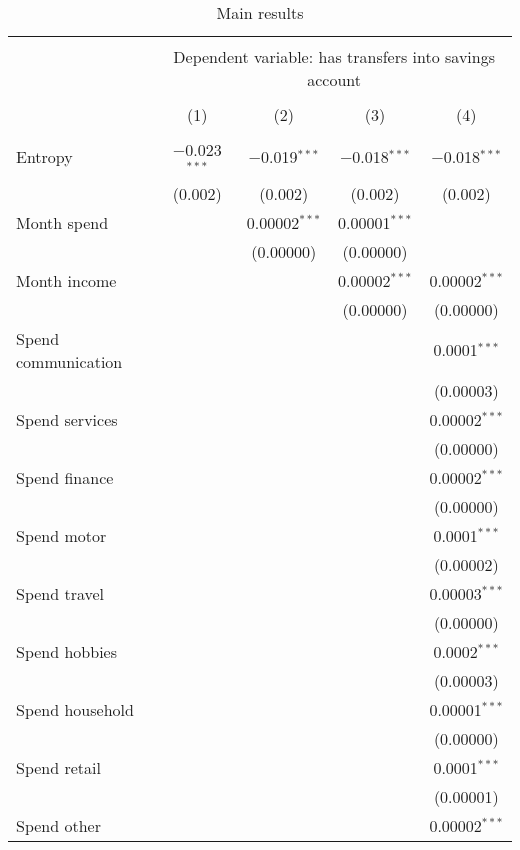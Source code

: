 
\begin{table}[!htbp] \centering 
  \caption{Main results} 
  \label{} 
\begin{tabular}{@{\extracolsep{5pt}}lcccc} 
\\[-1.8ex]\hline 
\hline \\[-1.8ex] 
 & \multicolumn{4}{c}{Dependent variable: has transfers into savings account} \\ 
\cline{2-5} 
\\[-1.8ex] & (1) & (2) & (3) & (4)\\ 
\hline \\[-1.8ex] 
 Entropy & $-$0.023$^{***}$ & $-$0.019$^{***}$ & $-$0.018$^{***}$ & $-$0.018$^{***}$ \\ 
  & (0.002) & (0.002) & (0.002) & (0.002) \\ 
  Month spend &  & 0.00002$^{***}$ & 0.00001$^{***}$ &  \\ 
  &  & (0.00000) & (0.00000) &  \\ 
  Month income &  &  & 0.00002$^{***}$ & 0.00002$^{***}$ \\ 
  &  &  & (0.00000) & (0.00000) \\ 
  Spend communication &  &  &  & 0.0001$^{***}$ \\ 
  &  &  &  & (0.00003) \\ 
  Spend services &  &  &  & 0.00002$^{***}$ \\ 
  &  &  &  & (0.00000) \\ 
  Spend finance &  &  &  & 0.00002$^{***}$ \\ 
  &  &  &  & (0.00000) \\ 
  Spend motor &  &  &  & 0.0001$^{***}$ \\ 
  &  &  &  & (0.00002) \\ 
  Spend travel &  &  &  & 0.00003$^{***}$ \\ 
  &  &  &  & (0.00000) \\ 
  Spend hobbies &  &  &  & 0.0002$^{***}$ \\ 
  &  &  &  & (0.00003) \\ 
  Spend household &  &  &  & 0.00001$^{***}$ \\ 
  &  &  &  & (0.00000) \\ 
  Spend retail &  &  &  & 0.0001$^{***}$ \\ 
  &  &  &  & (0.00001) \\ 
  Spend other &  &  &  & 0.00002$^{***}$ \\ 

\end{tabular}
\end{table}
